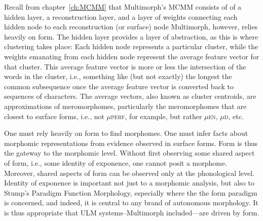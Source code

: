 Recall from chapter~\ref{ch:MCMM} that Multimorph's \ac{MCMM} consists of
of a hidden layer, a reconstruction layer, and a layer of
weights connecting each hidden node to each reconstruction (or surface) node
Multimorph, however, relies heavily on form. The hidden 
layer provides a layer of abstraction, as this is where 
clustering takes place: Each hidden node represents 
a particular cluster, while the weights emanating from
each hidden node represent the average feature vector for that
cluster. This average feature vector is more or less the intersection
of the words in the cluster, i.e., something like (but not exactly) 
the longest the common subsequence once the average feature vector
is converted back to sequences of characters. The average vectors, also known as
cluster centroids, are approximations of meromorphomes, 
particularly the meromorphomes
that are closest to surface forms, i.e., not $\mu${\textsc{perf}}, 
for example, but rather $\mu${\textsc{en}},
$\mu${\textsc{d}}, etc.


One must rely heavily on form to find morphomes. One must infer facts 
about morphomic representations
from evidence observed in surface forms. Form is thus the 
gateway to the morphomic level. Without first observing 
some shared aspect of form, i.e., some identity of exponence, one cannot posit 
a morphome. Moreover, shared 
aspects of form can be observed only at the phonological level.
Identity of exponence is important not just to a morphomic analysis,
but also to Stump's Paradigm Function Morphology, especially where the 
the form paradigm is concerned, and indeed, it is central to any 
brand of autonomous morphology. It is thus appropriate that \ac{ULM}  systems--Multimorph
included---are driven by form.





